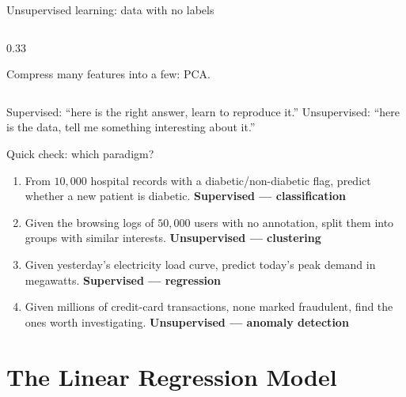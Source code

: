 \documentclass[aspectratio=169,10pt]{beamer}
\begin{document}
\begin{frame}{Unsupervised learning: data with no labels}
\begin{columns}[T,onlytextwidth]
\begin{column}{0.33\textwidth}
      {\scriptsize Compress many features into a few: PCA.}
    \end{column}
  \end{columns}
  \vspace{2mm}
  \begin{keyidea}
    Supervised: ``here is the right answer, learn to reproduce it.''\quad
    Unsupervised: ``here is the data, tell me something interesting about it.''
  \end{keyidea}
\end{frame}

\begin{frame}{Quick check: which paradigm?}
  \small
  \begin{enumerate}
    \item From $10{,}000$ hospital records with a diabetic/non-diabetic flag,
          predict whether a new patient is diabetic. \pause
          \hfill{\color{cuteal}\textbf{Supervised --- classification}}\pause
    \item Given the browsing logs of $50{,}000$ users with no annotation, split
          them into groups with similar interests. \pause
          \hfill{\color{cuteal}\textbf{Unsupervised --- clustering}}\pause
    \item Given yesterday's electricity load curve, predict today's peak demand
          in megawatts. \pause
          \hfill{\color{cuteal}\textbf{Supervised --- regression}}\pause
    \item Given millions of credit-card transactions, none marked fraudulent,
          find the ones worth investigating. \pause
          \hfill{\color{cuteal}\textbf{Unsupervised --- anomaly detection}}
  \end{enumerate}
\end{frame}

\section{The Linear Regression Model}
\end{document}
